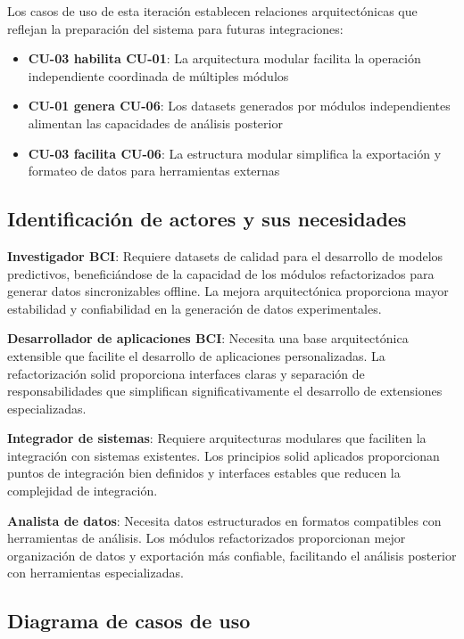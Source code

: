 Los casos de uso de esta iteración establecen relaciones arquitectónicas que reflejan la preparación del sistema para futuras integraciones:

\begin{itemize}
    \item \textbf{CU-03 habilita CU-01}: La arquitectura modular facilita la operación independiente coordinada de múltiples módulos
    \item \textbf{CU-01 genera CU-06}: Los datasets generados por módulos independientes alimentan las capacidades de análisis posterior
    \item \textbf{CU-03 facilita CU-06}: La estructura modular simplifica la exportación y formateo de datos para herramientas externas
\end{itemize}

\subsection{Identificación de actores y sus necesidades}
\label{subsec:actores_necesidades_it2}

\textbf{Investigador BCI}: Requiere datasets de calidad para el desarrollo de modelos predictivos, beneficiándose de la capacidad de los módulos refactorizados para generar datos sincronizables offline. La mejora arquitectónica proporciona mayor estabilidad y confiabilidad en la generación de datos experimentales.

\textbf{Desarrollador de aplicaciones BCI}: Necesita una base arquitectónica extensible que facilite el desarrollo de aplicaciones personalizadas. La refactorización \acrshort{solid} proporciona interfaces claras y separación de responsabilidades que simplifican significativamente el desarrollo de extensiones especializadas.

\textbf{Integrador de sistemas}: Requiere arquitecturas modulares que faciliten la integración con sistemas existentes. Los principios \acrshort{solid} aplicados proporcionan puntos de integración bien definidos y interfaces estables que reducen la complejidad de integración.

\textbf{Analista de datos}: Necesita datos estructurados en formatos compatibles con herramientas de análisis. Los módulos refactorizados proporcionan mejor organización de datos y exportación más confiable, facilitando el análisis posterior con herramientas especializadas.

\subsection{Diagrama de casos de uso}
\label{subsec:diagrama_casos_uso_it2}

